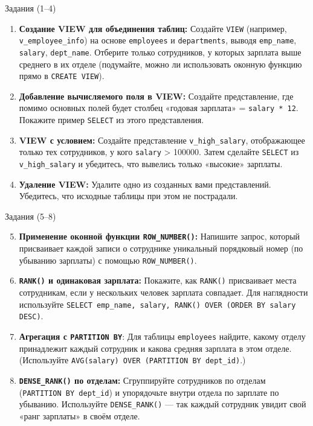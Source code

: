 \documentclass{beamer}
\begin{document}
\begin{frame}{Задания (1--4)}
	\begin{enumerate}
		\item \textbf{Создание VIEW для объединения таблиц:}
		      Создайте \texttt{VIEW} (например, \texttt{v\_employee\_info}) на основе \texttt{employees} и \texttt{departments},
		      выводя \texttt{emp\_name}, \texttt{salary}, \texttt{dept\_name}. Отберите только сотрудников, у которых зарплата выше среднего в их отделе
		      (подумайте, можно ли использовать оконную функцию прямо в \texttt{CREATE VIEW}).

		\item \textbf{Добавление вычисляемого поля в VIEW:}
		      Создайте представление, где помимо основных полей будет столбец «годовая зарплата» = \texttt{salary * 12}.
		      Покажите пример \texttt{SELECT} из этого представления.

		\item \textbf{VIEW с условием:}
		      Создайте представление \texttt{v\_high\_salary}, отображающее только тех сотрудников, у кого \texttt{salary} > 100000.
		      Затем сделайте \texttt{SELECT} из \texttt{v\_high\_salary} и убедитесь, что вывелись только «высокие» зарплаты.

		\item \textbf{Удаление VIEW:}
		      Удалите одно из созданных вами представлений. Убедитесь, что исходные таблицы при этом не пострадали.
	\end{enumerate}
\end{frame}

\begin{frame}{Задания (5--8)}
	\begin{enumerate}
		\setcounter{enumi}{4}
		\item \textbf{Применение оконной функции \texttt{ROW\_NUMBER()}:}
		      Напишите запрос, который присваивает каждой записи о сотруднике уникальный порядковый номер (по убыванию зарплаты) с помощью \texttt{ROW\_NUMBER()}.

		\item \textbf{\texttt{RANK()} и одинаковая зарплата:}
		      Покажите, как \texttt{RANK()} присваивает места сотрудникам, если у нескольких человек зарплата совпадает.
		      Для наглядности используйте \texttt{SELECT emp\_name, salary, RANK() OVER (ORDER BY salary DESC)}.

		\item \textbf{Агрегация с \texttt{PARTITION BY}}:
		      Для таблицы \texttt{employees} найдите, какому отделу принадлежит каждый сотрудник и какова средняя зарплата в этом отделе.
		      (Используйте \texttt{AVG(salary) OVER (PARTITION BY dept\_id)}.)

		\item \textbf{\texttt{DENSE\_RANK()} по отделам:}
		      Сгруппируйте сотрудников по отделам (\texttt{PARTITION BY dept\_id}) и упорядочьте внутри отдела по зарплате по убыванию.
		      Используйте \texttt{DENSE\_RANK()} — так каждый сотрудник увидит свой «ранг зарплаты» в своём отделе.
	\end{enumerate}
\end{frame}
\end{document}
